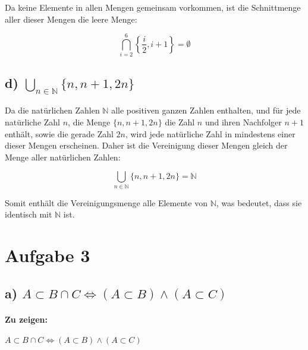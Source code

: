 \documentclass[12pt]{article}
\begin{document}
Da keine Elemente in allen Mengen gemeinsam vorkommen, ist die Schnittmenge aller dieser Mengen die leere Menge:

\[ \bigcap_{i=2}^{6} \left\{\frac{i}{2}, i + 1\right\} = \emptyset \]

\subsection*{d) \( \bigcup_{n \in \mathbb{N}} \{n, n + 1, 2n\} \)}

Da die natürlichen Zahlen \( \mathbb{N} \) alle positiven ganzen Zahlen enthalten, und für jede natürliche Zahl \( n \), die Menge \( \{n, n + 1, 2n\} \) die Zahl \( n \) und ihren Nachfolger \( n + 1 \) enthält, sowie die gerade Zahl \( 2n \), wird jede natürliche Zahl in mindestens einer dieser Mengen erscheinen. Daher ist die Vereinigung dieser Mengen gleich der Menge aller natürlichen Zahlen:

\[
	\bigcup_{n \in \mathbb{N}} \{n, n + 1, 2n\} = \mathbb{N}
\]

Somit enthält die Vereinigungsmenge alle Elemente von \( \mathbb{N} \), was bedeutet, dass sie identisch mit \( \mathbb{N} \) ist.

\section*{Aufgabe 3}

\subsection*{a) \( A \subset B \cap C \Leftrightarrow (A \subset B) \land (A \subset C) \)}

\paragraph{Zu zeigen:}
\( A \subset B \cap C \Leftrightarrow (A \subset B) \land (A \subset C) \)
\end{document}
